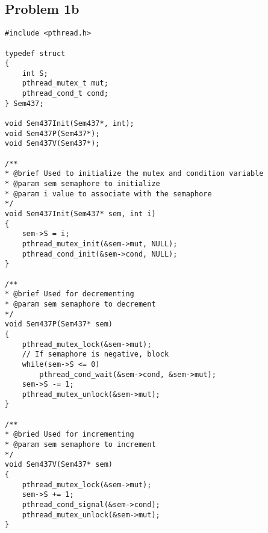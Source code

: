 \documentclass[12pt, a4paper, oneside]{article}
\begin{document}
\subsection*{Problem 1b}

\begin{lstlisting}
#include <pthread.h>

typedef struct
{
    int S;
    pthread_mutex_t mut;
    pthread_cond_t cond;
} Sem437;

void Sem437Init(Sem437*, int);
void Sem437P(Sem437*);
void Sem437V(Sem437*);

/**
* @brief Used to initialize the mutex and condition variable
* @param sem semaphore to initialize
* @param i value to associate with the semaphore
*/
void Sem437Init(Sem437* sem, int i)
{
    sem->S = i;
    pthread_mutex_init(&sem->mut, NULL);
    pthread_cond_init(&sem->cond, NULL);
}

/**
* @brief Used for decrementing
* @param sem semaphore to decrement
*/
void Sem437P(Sem437* sem)
{
    pthread_mutex_lock(&sem->mut);
    // If semaphore is negative, block
    while(sem->S <= 0)
        pthread_cond_wait(&sem->cond, &sem->mut);
    sem->S -= 1;
    pthread_mutex_unlock(&sem->mut);
}

/**
* @bried Used for incrementing
* @param sem semaphore to increment
*/
void Sem437V(Sem437* sem)
{
    pthread_mutex_lock(&sem->mut);
    sem->S += 1;
    pthread_cond_signal(&sem->cond);
    pthread_mutex_unlock(&sem->mut);
}
\end{lstlisting}
\end{document}

